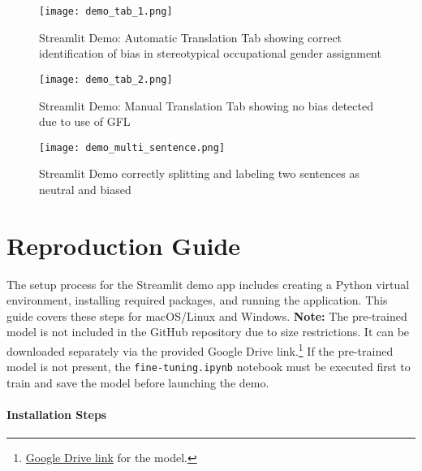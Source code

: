         \vspace{0.8em}
        \begin{figure}[H]
            \centering
            \texttt{[image: demo\_tab\_1.png]}
            \caption[Streamlit Demo: Automatic Translation Tab]{Streamlit Demo: Automatic Translation Tab showing correct identification of bias in stereotypical occupational gender assignment}
            \label{fig:demo_tab_1}
        \end{figure}
        \vspace{0.8em}

        \begin{figure}[H]
            \centering
            \texttt{[image: demo\_tab\_2.png]}
            \caption[Streamlit Demo: Manual Translation Tab]{Streamlit Demo: Manual Translation Tab showing no bias detected due to use of GFL}
            \label{fig:demo_tab_2}
        \end{figure}
        \vspace{0.8em}

        \begin{figure}[H]
            \centering
            \texttt{[image: demo\_multi\_sentence.png]}
            \caption[Streamlit Demo: Multi Sentence Translation]{Streamlit Demo correctly splitting and labeling two sentences as neutral and biased}
            \label{fig:demo_multi_sentence}
        \end{figure}
        \vspace{0.8em}

\section{Reproduction Guide} \label{section:reproduction_guide}
   The setup process for the Streamlit demo app includes creating a Python virtual environment, installing required packages, and running the application. This guide covers these steps for macOS/Linux and Windows. \textbf{Note:} The pre-trained model is not included in the GitHub repository due to size restrictions. It can be downloaded separately via the provided Google Drive link.\footnote{ \href{https://drive.google.com/drive/folders/11WMb0od_U_sQsUGD0t4DjQwcefI3r_kK?usp=sharing}{Google Drive link} for the model.} If the pre-trained model is not present, the \texttt{fine-tuning.ipynb} notebook must be executed first to train and save the model before launching the demo.
\paragraph{Installation Steps}

